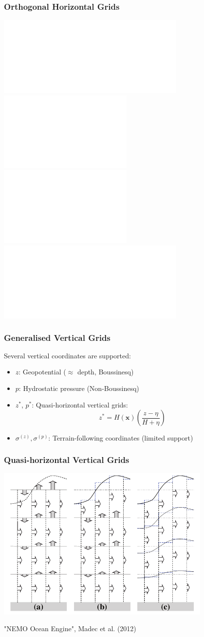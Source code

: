 \documentclass[red]{beamer}
\begin{document}
\begin{frame}
    \frametitle{Orthogonal Horizontal Grids}
    
    \begin{center}
        \includegraphics<1>[width=0.7\textwidth]{merc_tripolar.pdf}
        \includegraphics<2>[width=0.5\textwidth]{nh_tripolar.pdf}
        \includegraphics<2>[width=0.5\textwidth]{sh_tripolar.pdf}
        \includegraphics<3>[width=0.7\textwidth]{merc_auscom.pdf}
    \end{center}
\end{frame}

\begin{frame}
    \frametitle{Generalised Vertical Grids}
    
    Several vertical coordinates are supported:
    \begin{itemize}
        \item $z$: Geopotential ($\approx$ depth, Boussinesq)
        
        \item $p$: Hydrostatic pressure (Non-Boussinesq)
        
        \item $z^*$, $p^*$: Quasi-horizontal vertical grids:
            $$
            z^* = H(\mathbf{x}) \left(\frac{z - \eta}{H + \eta}\right)
            $$
        \item $\sigma^{(z)}, \sigma^{(p)}$: Terrain-following coordinates
            (limited support)
    \end{itemize}
\end{frame}

\begin{frame}
    \frametitle{Quasi-horizontal Vertical Grids}
    
    \begin{center}
        \includegraphics[width=0.8\textwidth]{zstar.pdf}
    \end{center}
    
    {\tiny "NEMO Ocean Engine", Madec et al. (2012)}
\end{frame}
\end{document}
